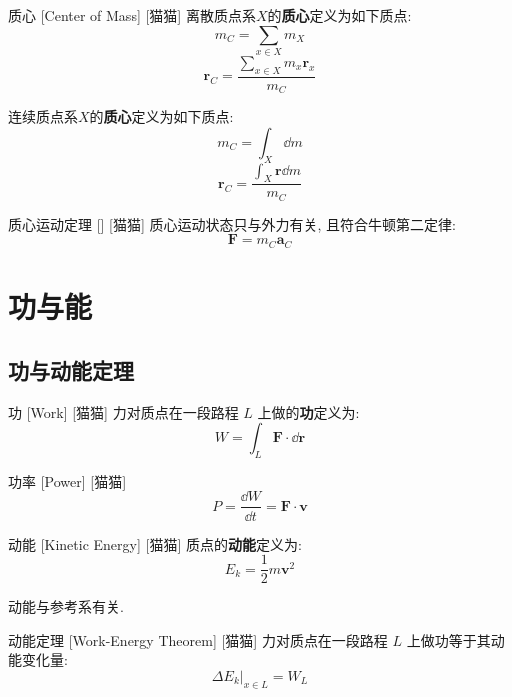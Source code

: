 \documentclass[UTF8]{ctexart}
\begin{document}
        \begin{dfn}
            []
            {质心}
            [Center of Mass]
            [猫猫]
            离散质点系\(X\)的\textbf{质心}定义为如下质点: 
            \[m_C=\sum_{x\in X}m_X\]
            \[\bm{r}_C=\frac{\sum\limits_{x\in X}m_x\bm{r}_x}{m_C}\]

            连续质点系\(X\)的\textbf{质心}定义为如下质点:
            \[m_C=\int_X\dd m\]
            \[\bm{r}_C=\frac{\int_X\bm{r}\dd m}{m_C}\]
        \end{dfn}
        
        \begin{thm}
            []
            {质心运动定理}
            []
            [猫猫]
            质心运动状态只与外力有关, 且符合牛顿第二定律: 
            \[\bm{F}=m_C\bm{a}_C\]
        \end{thm}

\section{功与能}

    \subsection{功与动能定理}
        
        \begin{dfn}
            []
            {功}
            [Work]
            [猫猫]
            力对质点在一段路程 \(L\) 上做的\textbf{功}定义为: 
            \[W=\int_L\bm{F}\cdot\dd\bm{r}\]
        \end{dfn}
        
        \begin{dfn}
            []
            {功率}
            [Power]
            [猫猫]
            \[P=\frac{\dd W}{\dd t}=\bm{F}\cdot\bm{v}\]
        \end{dfn}
        
        \begin{dfn}
            []
            {动能}
            [Kinetic Energy]
            [猫猫]
            质点的\textbf{动能}定义为: 
            \[E_k=\frac{1}{2}m\bm{v}^2\]

            动能与参考系有关. 
        \end{dfn}
        
        \begin{thm}
            []
            {动能定理}
            [Work-Energy Theorem]
            [猫猫]
            力对质点在一段路程 \(L\) 上做功等于其动能变化量: 
            \[\Delta E_k|_{x\in L}=W_L\]
        \end{thm}
        
\end{document}
